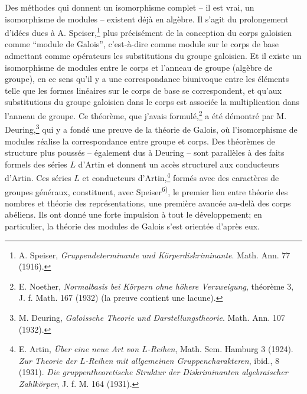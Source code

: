 Des méthodes qui donnent un isomorphisme complet -- il est vrai, un isomorphisme de modules -- existent déjà en algèbre. Il s'agit du prolongement d'idées dues à A. Speiser,\footnote{A. Speiser, \emph{Gruppendeterminante und Körperdiskriminante}. Math. Ann. 77 (1916).} plus précisément de la conception du corps galoisien comme ``module de Galois'', c'est-à-dire comme module sur le corps de base admettant comme opérateurs les substitutions du groupe galoisien. Et il existe un isomorphisme de modules entre le corps et l'anneau de groupe (algèbre de groupe), en ce sens qu'il y a une correspondance biunivoque entre les éléments telle que les formes linéaires sur le corps de base se correspondent, et qu'aux substitutions du groupe galoisien dans le corps est associée la multiplication dans l'anneau de groupe. Ce théorème, que j'avais formulé,\footnote{E. Noether, \emph{Normalbasis bei Körpern ohne höhere Verzweigung}, théorème 3, J. f. Math. 167 (1932) (la preuve contient une lacune).} a été démontré par M. Deuring,\footnote{M. Deuring, \emph{Galoissche Theorie und Darstellungstheorie}. Math. Ann. 107 (1932).} qui y a fondé une preuve de la théorie de Galois, où l'isomorphisme de modules réalise la correspondance entre groupe et corps. Des théorèmes de structure plus poussés -- également dus à Deuring -- sont parallèles à des faits formels des séries \(L\) d'Artin et donnent un accès structurel aux conducteurs d'Artin. Ces séries \(L\) et conducteurs d'Artin,\footnote{E. Artin, \emph{Über eine neue Art von \(L\)-Reihen}, Math. Sem. Hamburg 3 (1924). \emph{Zur Theorie der \(L\)-Reihen mit allgemeinen Gruppencharakteren}, ibid., 8 (1931). \emph{Die gruppentheoretische Struktur der Diskriminanten algebraischer Zahlkörper}, J. f. M. 164 (1931).} formés avec des caractères de groupes généraux, constituent, avec Speiser\textsuperscript{6)}, le premier lien entre théorie des nombres et théorie des représentations, une première avancée au-delà des corps abéliens. Ils ont donné une forte impulsion à tout le développement; en particulier, la théorie des modules de Galois s'est orientée d'après eux.

